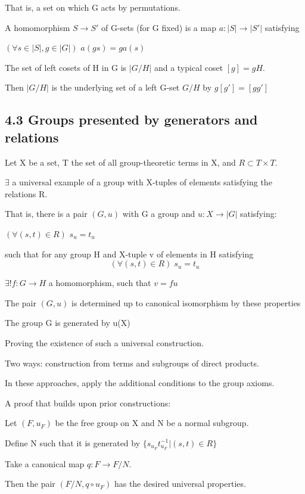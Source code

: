 \documentclass[12pt]{article}
\begin{document}
That is, a set on which G acts by permutations.

\noindent
A homomorphism $S \to S'$ of G-sets (for G fixed) is a map $a: |S| \to |S'|$ satisfying

$(\forall s \in |S|, g \in |G|)$ $a(gs) = g a (s)$

\noindent
The set of left cosets of H in G is $|G \slash H|$ and a typical coset $[g] = gH$.

Then $|G\slash H|$ is the underlying set of a left G-set $G\slash H$ by $g[g'] = [gg']$

\subsection{4.3 Groups presented by generators and relations}

Let X be a set, T the set of all group-theoretic terms in X, and $R \subset T \times T$.

$\exists$ a universal example of a group with X-tuples of elements satisfying the relations R.

\noindent
That is, there is a pair $(G, u)$ with G a group and $u: X \to |G|$ satisfying:

$(\forall (s, t) \in R)$ $s_u = t_u$

such that for any group H and X-tuple v of elements in H satisfying $$(\forall (s, t) \in R) \; s_u = t_u$$

$\exists ! f: G \to H$ a homomorphism, such that $v = fu$

The pair $(G, u)$ is determined up to canonical isomorphism by these properties

The group G is generated by u(X)

\noindent
Proving the existence of such a universal construction.

Two ways: construction from terms and subgroups of direct products.

In these approaches, apply the additional conditions to the group axioms.

\noindent
A proof that builds upon prior constructions:

Let $(F, u_F)$ be the free group on X and N be a normal subgroup.

Define N such that it is generated by $\{s_{u_F}t_{u_F}^{-1} | (s, t) \in R\}$

Take a canonical map $q: F \to F \slash N$.

Then the pair $(F\slash N, q \circ u_F)$ has the desired universal properties.
\end{document}
